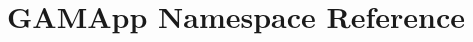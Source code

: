 \hypertarget{namespace_g_a_m_app}{\section{G\-A\-M\-App Namespace Reference}
\label{namespace_g_a_m_app}
}
